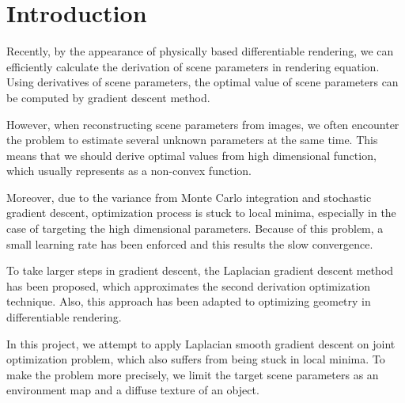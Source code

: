 \section*{Introduction}\label{ch:ch1label}

Recently, by the appearance of physically based differentiable rendering, we can efficiently calculate the derivation of scene parameters in rendering equation. Using derivatives of scene parameters, the optimal value of scene parameters can be computed by gradient descent method. 

However, when reconstructing scene parameters from images, we often encounter the problem to estimate several unknown parameters at the same time. This means that we should derive optimal values from high dimensional function, which usually represents as a non-convex function.

Moreover, due to the variance from Monte Carlo integration and stochastic gradient descent, optimization process is stuck to local minima, especially in the case of targeting the high dimensional parameters. Because of this problem, a small learning rate has been enforced and this results the slow convergence.

To take larger steps in gradient descent, the Laplacian gradient descent method has been proposed, which approximates the second derivation optimization technique\cite{osher2018laplacian}.
Also, this approach has been adapted to optimizing geometry in differentiable rendering\cite{Nicolet2021Large}.

In this project, we attempt to apply Laplacian smooth gradient descent on joint optimization problem, which also suffers from being stuck in local minima. To make the problem more precisely, we limit the target scene parameters as an environment map and a diffuse texture of an object.